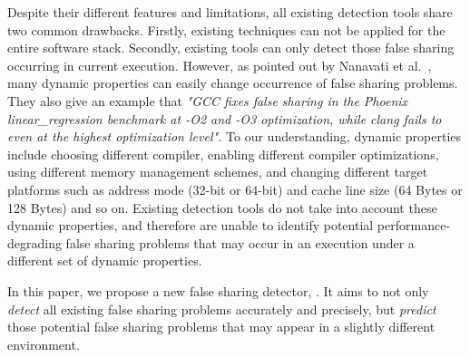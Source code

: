 Despite their different features and limitations, all existing detection tools 
share two common drawbacks.
Firstly, existing techniques can not be applied for 
the entire software stack.
Secondly, existing tools can only detect those false sharing occurring in current execution.
However, as pointed out by Nanavati et al.~\cite{OSdetection}, 
many dynamic properties can easily change occurrence of false sharing problems.
They also give an example that 
{\it "GCC fixes false sharing in the Phoenix linear\_regression benchmark 
at -O2 and -O3 optimization, while clang fails to even at the highest
optimization level".}
To our understanding, dynamic properties include 
choosing different compiler, 
enabling different compiler optimizations, 
using different memory management schemes,
and changing different target platforms such as address mode (32-bit or 64-bit) and cache line
size (64 Bytes or 128 Bytes) and so on. 
Existing detection tools do not take into account these dynamic properties, and
therefore are unable to identify potential performance-degrading false
sharing problems that may occur in an execution under a different set of 
dynamic properties.

In this paper, we propose a new false sharing detector, \Predator{}.
It aims to not only {\it detect} all existing false sharing problems accurately and precisely,
but {\it predict} those potential 
false sharing problems that may appear in a slightly different environment. 

